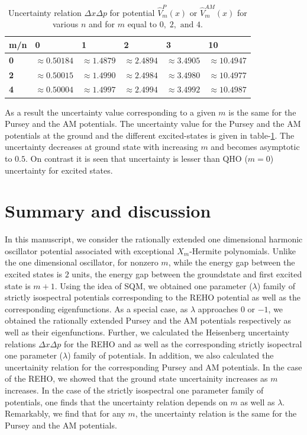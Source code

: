 \documentclass[11pt]{article}
\begin{document}
\begin{table}[htp]
\centering
\setlength{\tabcolsep}{1em}
\begin{tabularx}{\columnwidth}{@{}>{\bfseries}l X X X X l @{}}
\toprule
m/n & 0 & 1& 2&3&10\\
\toprule
0&\(\approx 0.50184 \)&\( \approx 1.4879\)&\(\approx 2.4894 \)&\( \approx 3.4905\)&\(\approx 10.4947 \)\\
2&\( \approx 0.50015\)&\(\approx 1.4990 \)&\( \approx 2.4984\)&\( \approx 3.4980\)&\(\approx 10.4977 \)\\
4&\( \approx 0.50004\)&\(\approx 1.4997 \)&\(\approx 2.4994 \)&\( \approx 3.4992\)&\( \approx 10.4987\)\\
\bottomrule
\end{tabularx}
\caption{ Uncertainty relation \( \Delta x \Delta p \) for potential \( \hat{V}^{P}_m(x) \) or \( \hat{V}^{AM}_m(x) \) for various \( n \) and for \( m \) equal to \( 0,\;2,\text{ and }4 \).}
\label{tab-un-pam}
\end{table}

As a result the uncertainty value corresponding to a given \( m \) is the 
same for the Pursey and the AM potentials. The uncertainty value for the Pursey and the AM potentials at the ground and the different excited-states is given in table-\ref{tab-un-pam}.  The uncertainty decreases at ground state with increasing \( m \) and becomes asymptotic to \( 0.5 \). On contrast it is seen that uncertainty is lesser than QHO (\( m=0 \)) uncertainty for excited states.


\section{Summary and discussion}
In this manuscript, we consider the rationally extended one dimensional 
harmonic oscillator potential associated with exceptional $X_m$-Hermite 
polynomials. Unlike the one dimensional oscillator, for nonzero $m$, while the
energy gap between the excited states is $2$ units, the energy gap between 
the groundstate and first excited state is \( m+1 \). Using the idea of SQM, we 
obtained one parameter ($\lambda$) family of strictly isospectral potentials 
corresponding to the REHO potential as well as the corresponding 
eigenfunctions. As a special case, as $\lambda$ approaches $0$ or $-1$, we 
obtained the rationally extended Pursey and the AM potentials respectively as 
well as their eigenfunctions. 
Further, we calculated the Heisenberg uncertainty relations $\Delta x \Delta p$
for the REHO and as well as the corresponding strictly isopectral one parameter
($\lambda$) family of potentials. In addition, we also calculated the 
uncertainity relation for the corresponding Pursey and AM potentials. In the 
case of the REHO, we showed that the ground state 
uncertainity increases as \(m\) increases. In the case of the strictly 
isospectral one parameter family of potentials, one finds that the uncertainty
relation depends on $m$ as well as $\lambda$. Remarkably, we find that for any
$m$, the uncertainty relation is the same for the Pursey and the AM potentials. 
\end{document}
